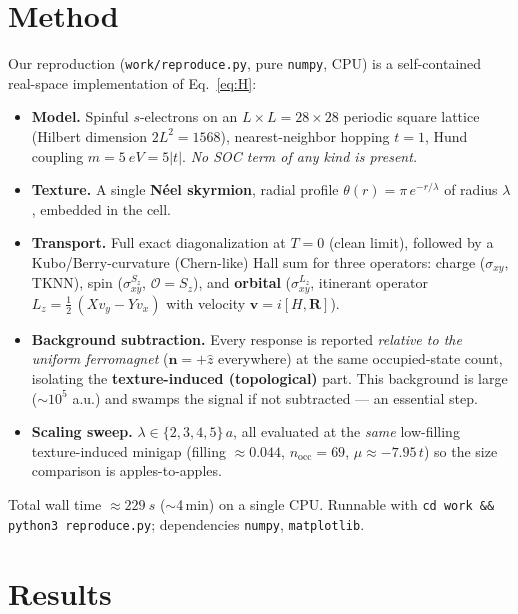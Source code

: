 \documentclass[11pt]{article}
\newcommand{\sigLz}{\sigma^{L_z}_{xy}}
\newcommand{\sigSz}{\sigma^{S_z}_{xy}}
\newcommand{\sigC}{\sigma_{xy}}
\begin{document}
\section{Method}
Our reproduction (\texttt{work/reproduce.py}, pure \texttt{numpy}, CPU) is a self-contained
real-space implementation of Eq.~\eqref{eq:H}:
\begin{itemize}
  \item \textbf{Model.} Spinful $s$-electrons on an $L\times L=28\times28$ periodic square
  lattice (Hilbert dimension $2L^2=1568$), nearest-neighbor hopping $t=1$, Hund coupling
  $m=\SI{5}{eV}=5|t|$. \emph{No SOC term of any kind is present.}
  \item \textbf{Texture.} A single \textbf{N\'eel skyrmion}, radial profile
  $\theta(r)=\pi\,e^{-r/\lambda}$ of radius $\lambda$, embedded in the cell.
  \item \textbf{Transport.} Full exact diagonalization at $T=0$ (clean limit), followed by a
  Kubo/Berry-curvature (Chern-like) Hall sum for three operators:
  charge ($\sigC$, TKNN), spin ($\sigSz$, $\mathcal{O}=S_z$), and \textbf{orbital}
  ($\sigLz$, itinerant operator $L_z=\tfrac12\,(X v_y - Y v_x)$ with velocity
  $\mathbf{v}=i[H,\mathbf{R}]$).
  \item \textbf{Background subtraction.} Every response is reported \emph{relative to the
  uniform ferromagnet} ($\mathbf{n}=+\hat z$ everywhere) at the same occupied-state count,
  isolating the \textbf{texture-induced (topological)} part. This background is large
  ($\sim\!10^5$ a.u.) and swamps the signal if not subtracted --- an essential step.
  \item \textbf{Scaling sweep.} $\lambda\in\{2,3,4,5\}\,a$, all evaluated at the \emph{same}
  low-filling texture-induced minigap (filling $\approx0.044$, $n_\mathrm{occ}=69$,
  $\mu\approx-7.95\,t$) so the size comparison is apples-to-apples.
\end{itemize}
Total wall time $\approx\SI{229}{s}$ ($\sim$4\,min) on a single CPU. Runnable with
\texttt{cd work \&\& python3 reproduce.py}; dependencies \texttt{numpy}, \texttt{matplotlib}.

\section{Results}
\end{document}
